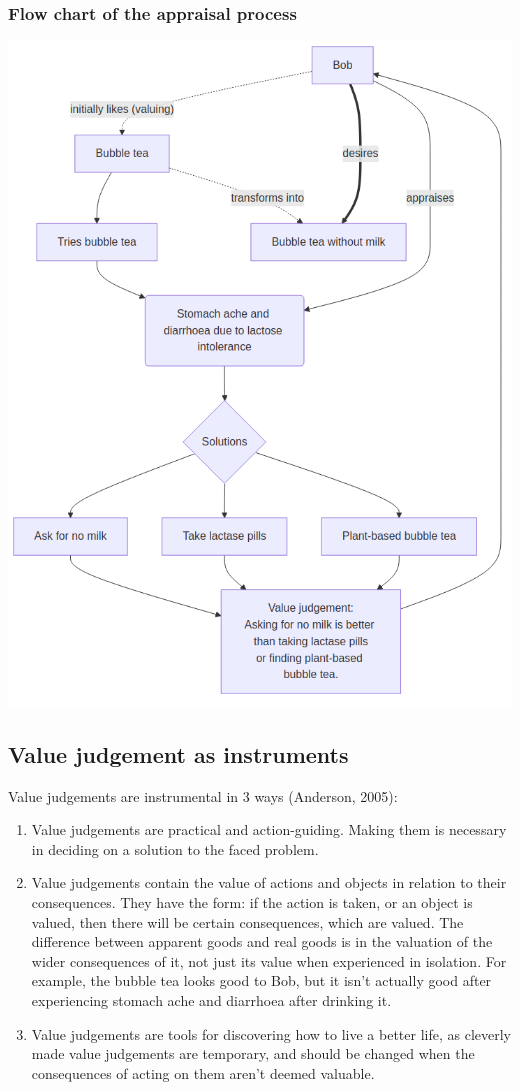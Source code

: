 \documentclass[11pt]{article}
\makeatletter
\newcommand{\cslcitation}[2]
 {\protect\hyper@linkstart{cite}{citeproc_bib_item_#1}#2\hyper@linkend}
\makeatother
\begin{document}
\subsubsection{Flow chart of the appraisal process}
\label{sec:org3d456d4}
\begin{center}
\includegraphics[width=.9\linewidth]{images/appraisal-process.png}
\label{orga723e52}
\end{center}

\clearpage
\subsection{Value judgement as instruments}
\label{sec:orgeb1e13f}
Value judgements are instrumental in 3 ways (\cslcitation{1}{Anderson, 2005}):
\begin{enumerate}
\item Value judgements are practical and action-guiding.
Making them is necessary in deciding on a solution to the faced problem.
\item Value judgements contain the value of actions and objects in
relation to their consequences. They have the form:
if the action is taken, or an object is valued,
then there will be certain consequences, which are valued.
The difference between apparent goods and real goods
is in the valuation of the wider consequences of it,
not just its value when experienced in isolation.
For example, the bubble tea looks good to Bob,
but it isn't actually good after experiencing
stomach ache and diarrhoea after drinking it.
\item Value judgements are tools for discovering how to live a better life,
as cleverly made value judgements are temporary,
and should be changed when the consequences of
acting on them aren't deemed valuable.
\end{enumerate}
\end{document}
